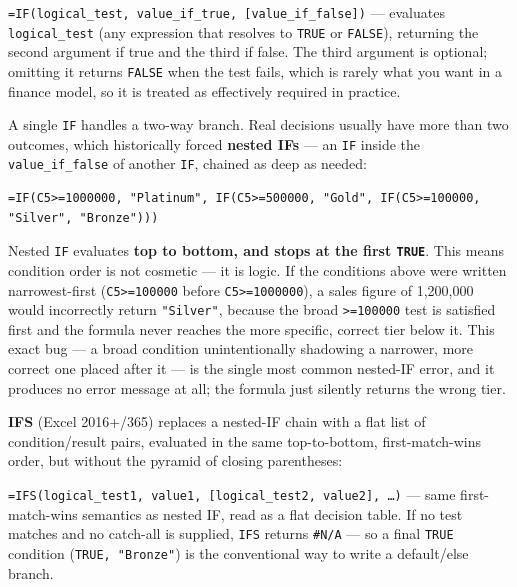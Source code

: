 \documentclass[11pt,a4paper]{article}
\begin{document}
\begin{formulasyntax}[IF]
\texttt{=IF(logical\_test, value\_if\_true, [value\_if\_false])} --- evaluates \texttt{logical\_test} (any expression that resolves to \texttt{TRUE} or \texttt{FALSE}), returning the second argument if true and the third if false. The third argument is optional; omitting it returns \texttt{FALSE} when the test fails, which is rarely what you want in a finance model, so it is treated as effectively required in practice.
\end{formulasyntax}

A single \texttt{IF} handles a two-way branch. Real decisions usually have more than two outcomes, which historically forced \textbf{nested IFs} --- an \texttt{IF} inside the \texttt{value\_if\_false} of another \texttt{IF}, chained as deep as needed:

\begin{lstlisting}[style=excelstyle, caption={A three-tier bonus schedule, nested IF style}]
=IF(C5>=1000000, "Platinum", IF(C5>=500000, "Gold", IF(C5>=100000, "Silver", "Bronze")))
\end{lstlisting}

\begin{keyconcept}
Nested \texttt{IF} evaluates \textbf{top to bottom, and stops at the first \texttt{TRUE}}. This means condition order is not cosmetic --- it is logic. If the conditions above were written narrowest-first (\texttt{C5>=100000} before \texttt{C5>=1000000}), a sales figure of 1,200,000 would incorrectly return \texttt{"Silver"}, because the broad \texttt{>=100000} test is satisfied first and the formula never reaches the more specific, correct tier below it. This exact bug --- a broad condition unintentionally shadowing a narrower, more correct one placed after it --- is the single most common nested-IF error, and it produces no error message at all; the formula just silently returns the wrong tier.
\end{keyconcept}

\textbf{IFS} (Excel 2016+/365) replaces a nested-IF chain with a flat list of condition/result pairs, evaluated in the same top-to-bottom, first-match-wins order, but without the pyramid of closing parentheses:

\begin{formulasyntax}[IFS]
\texttt{=IFS(logical\_test1, value1, [logical\_test2, value2], \ldots)} --- same first-match-wins semantics as nested IF, read as a flat decision table. If no test matches and no catch-all is supplied, \texttt{IFS} returns \texttt{\#N/A} --- so a final \texttt{TRUE} condition (\texttt{TRUE, "Bronze"}) is the conventional way to write a default/else branch.
\end{formulasyntax}
\end{document}
